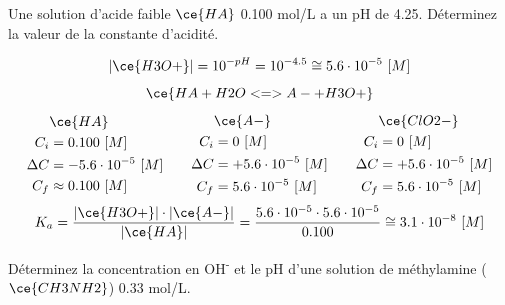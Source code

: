 \documentclass[
  11pt,
  a4paper,
  openany]{book}
\begin{document}
\begin{Exercise}
Une solution d'acide faible \(\ce{HA}\) 0.100 mol/L a un pH de 4.25. Déterminez la valeur de la constante d'acidité.

\end{Exercise}

\begin{Answer}
\[
|\ce{H3O+}| = 10^{-pH} = 10^{-4.5} \cong 5.6 \cdot 10^{-5}\ [M]
\]
\[
\ce{HA + H2O <=> A- + H3O+}
\]
\[
\begin{split}
&\ce{HA}\\
C_i &= 0.100\ [M] \\
\Delta C &= - 5.6 \cdot 10^{-5}\ [M] \\
C_f &\approx 0.100\ [M] \\
\end{split}
\qquad
\begin{split}
&\ce{A-}\\
C_i &= 0\ [M] \\
\Delta C &= + 5.6 \cdot 10^{-5}\ [M] \\
C_f &= 5.6 \cdot 10^{-5}\ [M] \\
\end{split}
\qquad
\begin{split}
&\ce{ClO2-}\\
C_i &= 0\ [M] \\
\Delta C &= + 5.6 \cdot 10^{-5}\ [M] \\
C_f &= 5.6 \cdot 10^{-5}\ [M] \\
\end{split}
\]
\[
K_a = \frac{|\ce{H3O+}| \cdot |\ce{A-}|}{|\ce{HA}|} = \frac{5.6 \cdot 10^{-5} \cdot 5.6 \cdot 10^{-5}}{0.100} \cong 3.1 \cdot 10^{-8}\ [M]
\]

\end{Answer}

\clearpage

\begin{Exercise}
Déterminez la concentration en OH\textsuperscript{-} et le pH d'une solution de méthylamine (\(\ce{CH3NH2}\)) 0.33 mol/L.

\end{Exercise}
\end{document}
